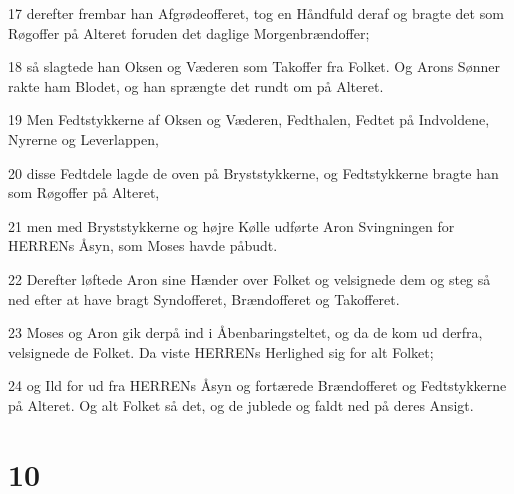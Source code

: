 \par 17 derefter frembar han Afgrødeofferet, tog en Håndfuld deraf og bragte det som Røgoffer på Alteret foruden det daglige Morgenbrændoffer;
\par 18 så slagtede han Oksen og Væderen som Takoffer fra Folket. Og Arons Sønner rakte ham Blodet, og han sprængte det rundt om på Alteret.
\par 19 Men Fedtstykkerne af Oksen og Væderen, Fedthalen, Fedtet på Indvoldene, Nyrerne og Leverlappen,
\par 20 disse Fedtdele lagde de oven på Bryststykkerne, og Fedtstykkerne bragte han som Røgoffer på Alteret,
\par 21 men med Bryststykkerne og højre Kølle udførte Aron Svingningen for HERRENs Åsyn, som Moses havde påbudt.
\par 22 Derefter løftede Aron sine Hænder over Folket og velsignede dem og steg så ned efter at have bragt Syndofferet, Brændofferet og Takofferet.
\par 23 Moses og Aron gik derpå ind i Åbenbaringsteltet, og da de kom ud derfra, velsignede de Folket. Da viste HERRENs Herlighed sig for alt Folket;
\par 24 og Ild for ud fra HERRENs Åsyn og fortærede Brændofferet og Fedtstykkerne på Alteret. Og alt Folket så det, og de jublede og faldt ned på deres Ansigt.

\chapter{10}

